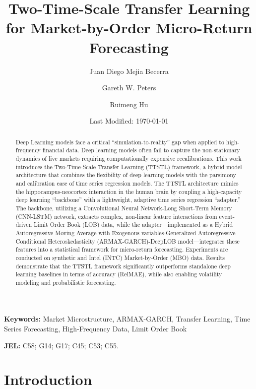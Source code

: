 \documentclass[10pt,a4paper,oneside]{article}
\title{Two-Time-Scale Transfer Learning for Market-by-Order Micro-Return Forecasting}
\author[1]{Juan Diego Mejia Becerra}
\author[1]{Gareth W. Peters}
\author[1,2]{Ruimeng Hu}
\affil[1]{Department of Statistics and Applied Probability, University of California, Santa Barbara}
\affil[2]{Department of Mathematics, University of California, Santa Barbara}
\date{Last Modified: \today}
\begin{document}

\maketitle
\linenumbers

\begin{abstract}
    Deep Learning models face a critical ``simulation-to-reality'' gap when applied to high-frequency financial data. Deep learning models often fail to capture the non-stationary dynamics of live markets requiring computationally expensive recalibrations. This work introduces the Two-Time-Scale Transfer Learning (TTSTL) framework, a hybrid model architecture that combines the flexibility of deep learning models with the parsimony and calibration ease of time series regression models. The TTSTL architecture mimics the hippocampus-neocortex interaction in the human brain by coupling a high-capacity deep learning ``backbone'' with a lightweight, adaptive time series regression ``adapter.'' The backbone, utilizing a Convolutional Neural Network-Long Short-Term Memory (CNN-LSTM) network, extracts complex, non-linear feature interactions from event-driven Limit Order Book (LOB) data, while the adapter—implemented as a Hybrid Autoregressive Moving Average with Exogenous variables-Generalized Autoregressive Conditional Heteroskedasticity (ARMAX-GARCH)-DeepLOB model—integrates these features into a statistical framework for micro-return forecasting. Experiments are conducted on synthetic and Intel (INTC) Market-by-Order (MBO) data. Results demonstrate that the TTSTL framework significantly outperforms standalone deep learning baselines in terms of accuracy (RelMAE), while also enabling volatility modeling and probabilistic forecasting.
\end{abstract}

\noindent \textbf{Keywords:} Market Microstructure, ARMAX-GARCH, Transfer Learning, Time Series Forecasting, High-Frequency Data, Limit Order Book

\noindent\textbf{JEL:} C58; G14; G17; C45; C53; C55.

\section{Introduction}
\label{Sect:Intro}
\end{document}
